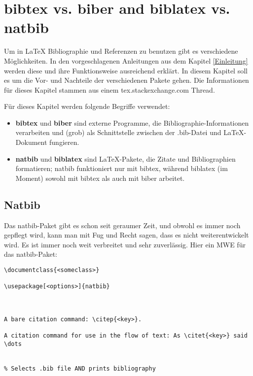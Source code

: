 \chapter{bibtex vs. biber and biblatex vs. natbib}
\label{bib}

Um in \LaTeX{} Bibliographie und Referenzen zu benutzen gibt es verschiedene Möglichkeiten. In den vorgeschlagenen Anleitungen aus dem Kapitel \ref{Einleitung} werden diese und ihre Funktionsweise ausreichend erklärt. In diesem Kapitel soll es um die Vor- und Nachteile der verschiedenen Pakete gehen. Die Informationen für dieses Kapitel stammen aus einem tex.stackexchange.com Thread.\autocite{bibvsvbib}

Für dieses Kapitel werden folgende Begriffe verwendet:

\begin{itemize}
	\item \textbf{bibtex} und \textbf{biber} sind externe Programme, die Bibliographie-Informationen verarbeiten und (grob) als Schnittstelle zwischen der .bib-Datei und LaTeX-Dokument fungieren.
	\item \textbf{natbib} und \textbf{biblatex} sind LaTeX-Pakete, die Zitate und Bibliographien formatieren; natbib funktioniert nur mit bibtex, während biblatex (im Moment) sowohl mit bibtex als auch mit biber arbeitet.
\end{itemize}


\section{Natbib}
Das natbib-Paket gibt es schon seit geraumer Zeit, und obwohl es immer noch gepflegt wird, kann man mit Fug und Recht sagen, dass es nicht weiterentwickelt wird. Es ist immer noch weit verbreitet und sehr zuverlässig. Hier ein MWE für das natbib-Paket:

\begin{lstlisting}[style=LaTeX]
\documentclass{<someclass>}

\usepackage[<options>]{natbib}



A bare citation command: \citep{<key>}.

A citation command for use in the flow of text: As \citet{<key>} said \dots


% Selects .bib file AND prints bibliography


\end{lstlisting}

